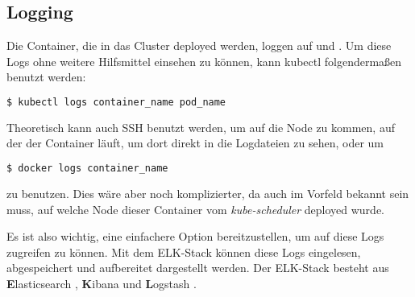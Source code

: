 \subsection{Logging}
Die Container, die in das Cluster deployed werden, loggen auf
 und .
Um diese Logs ohne weitere Hilfsmittel einsehen zu können, kann kubectl
folgendermaßen benutzt werden:
\begin{lstlisting}[language=Python,numbers=none]
$ kubectl logs container_name pod_name\end{lstlisting}
Theoretisch kann auch SSH benutzt werden, um auf die Node zu kommen, auf der der
Container läuft, um dort direkt in die Logdateien zu sehen, oder um
\begin{lstlisting}[language=Python,numbers=none]
$ docker logs container_name\end{lstlisting}
zu benutzen. Dies wäre aber noch komplizierter, da auch im Vorfeld bekannt
sein
muss, auf welche Node dieser Container vom \emph{kube-scheduler} deployed wurde.

Es ist also wichtig, eine einfachere Option bereitzustellen, um auf diese
Logs zugreifen zu können.
Mit dem ELK-Stack können diese Logs eingelesen, abgespeichert und aufbereitet
dargestellt werden.
Der ELK-Stack besteht aus \textbf{E}lasticsearch \cite{elasticsearch},
\textbf{K}ibana \cite{kibana} und
\textbf{L}ogstash \cite{logstash}.

